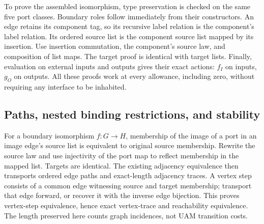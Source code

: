 
To prove the assembled isomorphism, type preservation is checked on the
same five port classes. Boundary roles follow immediately from their constructors.
An edge retains its component tag, so its recursive label relation is the
component's label relation. Its ordered source list is the component source list
mapped by its insertion. Use insertion commutation, the component's source law,
and composition of list maps. The target proof is identical with target lists.
Finally, evaluation on external inputs and outputs gives their exact actions:
$f_I$ on inputs, $g_O$ on outputs. All these proofs work at every allowance,
including zero, without requiring any interface to be inhabited.


\subsection{Paths, nested binding restrictions, and stability}
For a boundary isomorphism $f:G\to H$, membership of the image of a port in
an image edge's source list is equivalent to original source membership.
Rewrite the source law and use injectivity of the port map to reflect membership
in the mapped list. Targets are identical. The existing adjacency equivalence
then transports ordered edge paths and exact-length adjacency traces. A vertex
step consists of a common edge witnessing source and target membership; transport
that edge forward, or recover it with the inverse edge bijection. This proves
vertex-step equivalence, hence exact vertex-trace and reachability equivalence.
The length preserved here counts graph incidences, not UAM transition costs.


